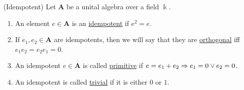 \begin{definition}{(Idempotent)}\label{def:idempotent}
Let $\mathbf{A}$ be a unital algebra over a field $\Bbbk$.
\begin{enumerate}
\renewcommand{\labelenumi}{(\theenumi)}
\item An element $e\in \mathbf{A}$ is an \ul{idempotent} if $e^{2} = e$.
\item If $e_{1}, e_{2} \in \mathbf{A}$ are idempotents, then we will say that they are \ul{orthogonal} iff $e_{1}e_{2} = e_{2}e_{1} = 0$.
\item An idempotent $e \in \mathbf{A}$ is called \ul{primitive} if $e = e_{1} + e_{2} \Rightarrow e_{1} = 0 \vee e_{2} = 0$.
\item An idempotent is called \ul{trivial} if it is either $0$ or $1$.
\end{enumerate}
\end{definition}


